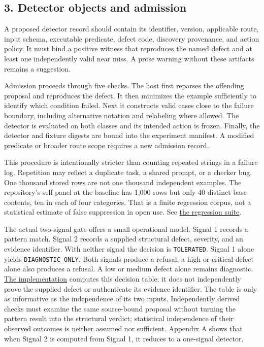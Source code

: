 \documentclass[
  11pt,
]{article}
\newcommand{\passthrough}[1]{#1}
\begin{document}
\subsection{3. Detector objects and
admission}\label{detector-objects-and-admission}

A proposed detector record should contain its identifier, version,
applicable route, input schema, executable predicate, defect code,
discovery provenance, and action policy. It must bind a positive witness
that reproduces the named defect and at least one independently valid
near miss. A prose warning without these artifacts remains a suggestion.

Admission proceeds through five checks. The host first reparses the
offending proposal and reproduces the defect. It then minimizes the
example sufficiently to identify which condition failed. Next it
constructs valid cases close to the failure boundary, including
alternative notation and relabeling where allowed. The detector is
evaluated on both classes and its intended action is frozen. Finally,
the detector and fixture digests are bound into the experiment manifest.
A modified predicate or broader route scope requires a new admission
record.

This procedure is intentionally stricter than counting repeated strings
in a failure log. Repetition may reflect a duplicate task, a shared
prompt, or a checker bug. One thousand stored rows are not one thousand
independent examples. The repository's self panel at the baseline has
1,000 rows but only 40 distinct base contents, ten in each of four
categories. That is a finite regression corpus, not a statistical
estimate of false suppression in open use. See
\href{https://github.com/dbccpage/the_symbol_game/blob/52cb5457f6c485ba548cfd292f6012a941ed22cf/omega_engine_pfp/tests/test_immune_defect_regressions.py}{the
regression suite}.

The actual two-signal gate offers a small operational model. Signal 1
records a pattern match. Signal 2 records a supplied structural defect,
severity, and an evidence identifier. With neither signal the decision
is \passthrough{\lstinline!TOLERATED!}. Signal 1 alone yields
\nolinkurl{DIAGNOSTIC_ONLY}. Both signals produce a refusal; a high or
critical defect alone also produces a refusal. A low or medium defect
alone remains diagnostic.
\href{https://github.com/dbccpage/the_symbol_game/blob/52cb5457f6c485ba548cfd292f6012a941ed22cf/omega_engine_pfp/domain/immune/danger_gate.py}{The
implementation} computes this decision table; it does not independently
prove the supplied defect or authenticate its evidence identifier. The
table is only as informative as the independence of its two inputs.
Independently derived checks must examine the same source-bound proposal
without turning the pattern result into the structural verdict;
statistical independence of their observed outcomes is neither assumed
nor sufficient. Appendix A shows that when Signal 2 is computed from
Signal 1, it reduces to a one-signal detector.
\end{document}
